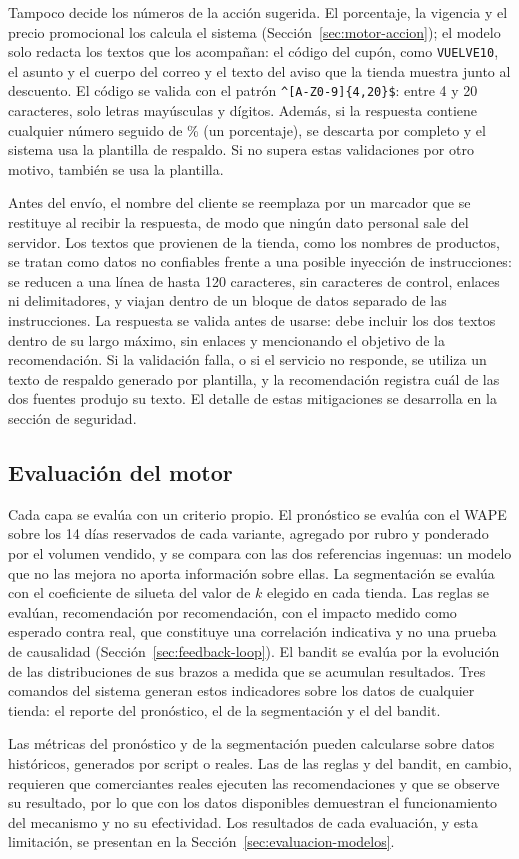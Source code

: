Tampoco decide los números de la acción sugerida. El porcentaje, la vigencia y el precio promocional los calcula el sistema (Sección~\ref{sec:motor-accion}); el modelo solo redacta los textos que los acompañan: el código del cupón, como \texttt{VUELVE10}, el asunto y el cuerpo del correo y el texto del aviso que la tienda muestra junto al descuento. El código se valida con el patrón \texttt{\^{}[A-Z0-9]\{4,20\}\$}: entre 4 y 20 caracteres, solo letras mayúsculas y dígitos. Además, si la respuesta contiene cualquier número seguido de \% (un porcentaje), se descarta por completo y el sistema usa la plantilla de respaldo. Si no supera estas validaciones por otro motivo, también se usa la plantilla.

Antes del envío, el nombre del cliente se reemplaza por un marcador que se restituye al recibir la respuesta, de modo que ningún dato personal sale del servidor. Los textos que provienen de la tienda, como los nombres de productos, se tratan como datos no confiables frente a una posible inyección de instrucciones: se reducen a una línea de hasta 120 caracteres, sin caracteres de control, enlaces ni delimitadores, y viajan dentro de un bloque de datos separado de las instrucciones. La respuesta se valida antes de usarse: debe incluir los dos textos dentro de su largo máximo, sin enlaces y mencionando el objetivo de la recomendación. Si la validación falla, o si el servicio no responde, se utiliza un texto de respaldo generado por plantilla, y la recomendación registra cuál de las dos fuentes produjo su texto. El detalle de estas mitigaciones se desarrolla en la sección de seguridad.

\subsection{Evaluación del motor}
\label{sec:motor-evaluacion}

Cada capa se evalúa con un criterio propio. El pronóstico se evalúa con el WAPE sobre los 14 días reservados de cada variante, agregado por rubro y ponderado por el volumen vendido, y se compara con las dos referencias ingenuas: un modelo que no las mejora no aporta información sobre ellas. La segmentación se evalúa con el coeficiente de silueta del valor de $k$ elegido en cada tienda. Las reglas se evalúan, recomendación por recomendación, con el impacto medido como esperado contra real, que constituye una correlación indicativa y no una prueba de causalidad (Sección~\ref{sec:feedback-loop}). El bandit se evalúa por la evolución de las distribuciones de sus brazos a medida que se acumulan resultados. Tres comandos del sistema generan estos indicadores sobre los datos de cualquier tienda: el reporte del pronóstico, el de la segmentación y el del bandit.

Las métricas del pronóstico y de la segmentación pueden calcularse sobre datos históricos, generados por script o reales. Las de las reglas y del bandit, en cambio, requieren que comerciantes reales ejecuten las recomendaciones y que se observe su resultado, por lo que con los datos disponibles demuestran el funcionamiento del mecanismo y no su efectividad. Los resultados de cada evaluación, y esta limitación, se presentan en la Sección~\ref{sec:evaluacion-modelos}.
